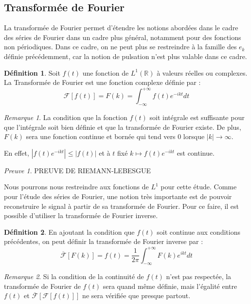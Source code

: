 \documentclass[]{article}
\theoremstyle{remark}
\newtheorem{myrem}{Remarque}
\newtheorem{myproof}{Preuve}
\theoremstyle{definition}
\newtheorem{mydef}{Définition}
\begin{document}
	\subsection{Transformée de Fourier}
		La transformée de Fourier permet d'étendre les notions abordées dans le cadre des séries de Fourier dans un cadre plus général, notamment pour des fonctions non périodiques. 
		Dans ce cadre, on ne peut plus se restreindre à la famille des $e_k$ définie précédemment, car la notion de pulsation n'est plus valable dans ce cadre. 
	
	\begin{mydef}
		Soit $f(t)$ une fonction de $L^1(\mathbb{R})$ à valeurs réelles ou complexes. La Transformée de Fourier est une fonction complexe définie par :
		$$ \mathcal{F}[f(t)] = F(k)= \int_{-\infty}^{+\infty}f(t)e^{-ikt}dt $$ 
	\end{mydef}

	\begin{myrem}
		La condition que la fonction $f(t)$ soit intégrale est suffisante pour que l'intégrale soit bien définie et que la transformée de Fourier existe. 
		De plus, $F(k)$ sera une fonction continue et bornée qui tend vers 0 lorsque $|k| \longrightarrow \infty$.
		
		En effet, $|f(t)e^{-i k t}| \leqslant |f(t)|$ et à $t$ fixé $k \mapsto f(t) e^{- i k t}$ est continue.
	\end{myrem}
	
	\begin{myproof}
		PREUVE DE RIEMANN-LEBESGUE
	\end{myproof}
	
	Nous pourrons nous restreindre aux fonctions de $L^1$ pour cette étude. 
	Comme pour l'étude des séries de Fourier, une notion très importante est de pouvoir reconstruire le signal à partir de sa transformée de Fourier. Pour ce faire, il est possible d'utiliser la transformée de Fourier inverse. 

	\begin{mydef}
		En ajoutant la condition que $f(t)$ soit continue aux conditions précédentes, on peut définir la transformée de Fourier inverse par :
		$$ \overline{\mathcal{F}}[F(k)] = f(t)=\frac{1}{{2\pi}} \int_{-\infty}^{+\infty}F(k)e^{ikt}dt $$ 
	\end{mydef}
	
	\begin{myrem}
		Si la condition de la continuité de $f(t)$ n'est pas respectée, la transformée de Fourier de $f(t)$ sera quand même définie, mais l'égalité entre $f(t)$ et $\overline{\mathcal{F}}[\mathcal{F}[f(t)]]$ ne sera vérifiée que presque partout. 
	\end{myrem}
			
\end{document}
